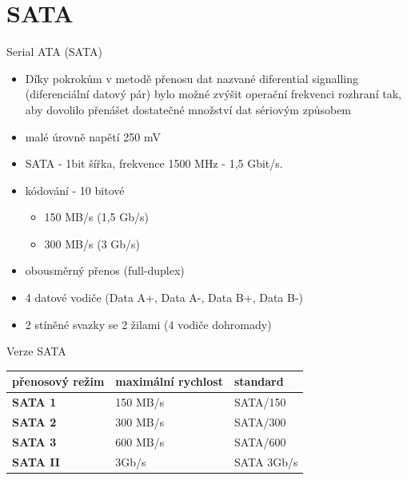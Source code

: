 \documentclass[aspectratio=43]{beamer}
\begin{document}
\section{SATA}
\begin{frame}{Serial ATA (SATA)}
	\begin{itemize}
		\item Díky pokrokům v metodě přenosu dat nazvané diferential signalling (diferenciální datový pár) bylo možné zvýšit operační frekvenci rozhraní tak, aby dovolilo přenášet dostatečné množství dat sériovým způsobem 
		\item malé úrovně napětí 250 mV
		\item SATA - 1bit šířka, frekvence 1500 MHz - 1,5 Gbit/s.
		\item kódování - 10 bitové
		      \begin{itemize}
		      	\item 150 MB/s (1,5 Gb/s) 
		      	\item 300 MB/s (3 Gb/s) 
		      \end{itemize}
		\item obousměrný přenos (full-duplex)
		\item 4 datové vodiče (Data A+, Data A-, Data B+, Data B-)
		\item 2 stíněné svazky se 2 žilami (4 vodiče dohromady)
	\end{itemize}
\end{frame}


\begin{frame}{Verze SATA}
	\begin{table}[]
		\begin{tabular}{|l|l|l|}
			\hline
			\textbf{přenosový režim} & \textbf{maximální rychlost} & \textbf{standard} \\ \hline
			\textbf{SATA 1}             & 150 MB/s                      & SATA/150          \\ \hline
			\textbf{SATA 2}             & 300 MB/s                      & SATA/300          \\ \hline
			\textbf{SATA 3}             & 600 MB/s                      & SATA/600          \\ \hline
			\textbf{SATA II }           & 3Gb/s                         & SATA 3Gb/s        \\ \hline
		\end{tabular}
	\end{table}
\end{frame}
\end{document}
